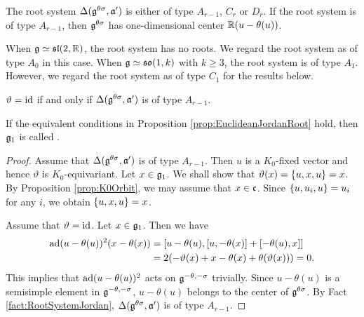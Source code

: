 \begin{fact}[{\cite[Table II]{Ka98}}] \label{fact:RootSystemJordan}
	The root system $\Delta(\mathfrak{g}^{\theta\sigma}, \mathfrak{a'})$ is either of type $A_{r-1}$, $C_r$ or $D_r$.
	If the root system is of type $A_{r-1}$, then $\mathfrak{g}^{\theta\sigma}$ has one-dimensional center $\mathbb{R}(u - \theta(u))$.
\end{fact}

\begin{remark}
	When $\mathfrak{g} \simeq \mathfrak{sl}(2,\mathbb{R})$, the root system has no roots.
	We regard the root system as of type $A_0$ in this case.
	When $\mathfrak{g} \simeq \mathfrak{so}(1, k)$ with $k \geq 3$, the root system is of type $A_1$.
	However, we regard the root system as of type $C_1$ for the results below.
\end{remark}

\begin{proposition} \label{prop:EuclideanJordanRoot}
	$\vartheta = \operatorname{id}$ if and only if $\Delta(\mathfrak{g}^{\theta\sigma}, \mathfrak{a'})$ is of type $A_{r-1}$.
\end{proposition}

\begin{remark}
	If the equivalent conditions in Proposition \ref{prop:EuclideanJordanRoot} hold, then $\mathfrak{g}_1$ is called .
\end{remark}

\begin{proof}
	Assume that $\Delta(\mathfrak{g}^{\theta\sigma}, \mathfrak{a'})$ is of type $A_{r-1}$.
	Then $u$ is a $K_0$-fixed vector and hence $\vartheta$ is $K_0$-equivariant.
	Let $x \in \mathfrak{g}_1$.
	We shall show that $\vartheta(x) = \{u, x, u\} = x$.
	By Proposition \ref{prop:K0Orbit}, we may assume that $x \in \mathfrak{c}$.
	Since $\{u, u_i, u\} = u_i$ for any $i$, we obtain $\{u, x, u\} = x$.

	Assume that $\vartheta = \operatorname{id}$.
	Let $x \in \mathfrak{g}_1$.
	Then we have
	\begin{align*}
		\mathrm{ad}(u - \theta(u))^2 (x - \theta(x)) &= [u - \theta(u), [u,-\theta(x)] + [-\theta(u), x]] \\
		&= 2(-\vartheta(x) + x - \theta(x) + \theta(\vartheta(x))) = 0.
	\end{align*}
	This implies that $\mathrm{ad}(u - \theta(u))^2$ acts on $\mathfrak{g}^{-\theta, -\sigma}$ trivially.
	Since $u - \theta(u)$ is a semisimple element in $\mathfrak{g}^{-\theta, -\sigma}$, $u-\theta(u)$ belongs to the center of $\mathfrak{g}^{\theta\sigma}$.
	By Fact \ref{fact:RootSystemJordan}, $\Delta(\mathfrak{g}^{\theta\sigma}, \mathfrak{a'})$ is of type $A_{r-1}$.
\end{proof}

